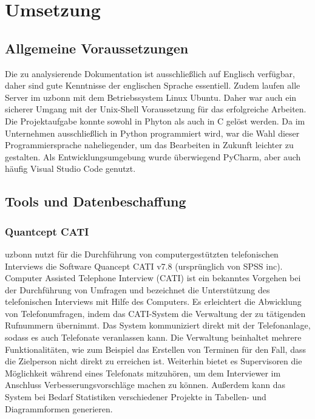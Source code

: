 \section{Umsetzung }\label{sec:umsetzung}

\subsection{Allgemeine Voraussetzungen}
Die zu analysierende Dokumentation ist ausschließlich auf Englisch verfügbar, daher sind gute Kenntnisse der englischen Sprache essentiell. Zudem laufen alle Server im uzbonn mit dem Betriebssystem Linux Ubuntu. Daher war auch ein sicherer Umgang mit der Unix-Shell Voraussetzung für das erfolgreiche Arbeiten. Die Projektaufgabe konnte sowohl in Phyton als auch in C gelöst werden. Da im Unternehmen ausschließlich in Python programmiert wird, war die Wahl dieser Programmiersprache naheliegender, um das Bearbeiten in Zukunft leichter zu gestalten. Als Entwicklungsumgebung wurde überwiegend PyCharm, aber auch häufig Visual Studio Code genutzt.

\subsection{Tools und Datenbeschaffung}
\subsubsection{Quantcept CATI}

uzbonn nutzt für die Durchführung von computergestützten telefonischen Interviews die Software Quancept CATI v7.8 (ursprünglich von SPSS inc). Computer Assisted Telephone Interview (CATI) ist ein bekanntes Vorgehen bei der Durchführung von Umfragen und bezeichnet die Unterstützung des telefonischen Interviews mit Hilfe des Computers. Es erleichtert die Abwicklung von Telefonumfragen, indem das CATI-System die Verwaltung der zu tätigenden Rufnummern übernimmt. Das System kommuniziert direkt mit der Telefonanlage, sodass es auch Telefonate veranlassen kann. Die Verwaltung beinhaltet mehrere Funktionalitäten, wie zum Beispiel das Erstellen von Terminen für den Fall, dass die Zielperson nicht direkt zu erreichen ist. Weiterhin bietet es Supervisoren die Möglichkeit  während eines Telefonats mitzuhören, um dem Interviewer im Anschluss Verbesserungsvorschläge machen zu können. Außerdem kann das System bei Bedarf Statistiken verschiedener Projekte in Tabellen- und Diagrammformen generieren.

